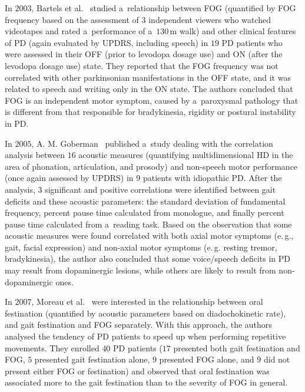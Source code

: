 In $2003$, Bartels et al.~\cite{Bartels2003} studied a~relationship between FOG (quantified by FOG frequency based on the assessment of $3$ independent viewers who watched videotapes and rated a~performance of a~$130$\,m walk) and other clinical features of PD (again evaluated by UPDRS, including speech) in $19$ PD patients who were assessed in their OFF (prior to levodopa dosage use) and ON (after the levodopa dosage use) state. They reported that the FOG frequency was not correlated with other parkinsonian manifestations in the OFF state, and it was related to speech and writing only in the ON state. The authors concluded that FOG is an independent motor symptom, caused by a~paroxysmal pathology that is different from that responsible for bradykinesia, rigidity or postural instability in PD.

In $2005$, A. M. Goberman~\cite{Goberman2005b} published a~study dealing with the correlation analysis between $16$ acoustic measures (quantifying multidimensional HD in the area of phonation, articulation, and prosody) and non-speech motor performance (once again assessed by UPDRS) in $9$ patients with idiopathic PD. After the analysis, $3$ significant and positive correlations were identified between gait deficits and these acoustic parameters: the standard deviation of fundamental frequency, percent pause time calculated from monologue, and finally percent pause time calculated from a~reading task. Based on the observation that some acoustic measures were found correlated with both axial motor symptoms (e.\,g., gait, facial expression) and non-axial motor symptoms (e.\,g. resting tremor, bradykinesia), the author also concluded that some voice/speech deficits in PD may result from dopaminergic lesions, while others are likely to result from non-dopaminergic ones.

In $2007$, Moreau et al.~\cite{Moreau2007} were interested in the relationship between oral festination (quantified by acoustic parameters based on diadochokinetic rate), and gait festination and FOG separately. With this approach, the authors analysed the tendency of PD patients to speed up when performing repetitive movements. They enrolled $40$ PD patients ($17$ presented both gait festination and FOG, $5$ presented gait festination alone, $9$ presented FOG alone, and $9$ did not present either FOG or festination) and observed that oral festination was associated more to the gait festination than to the severity of FOG in general.

